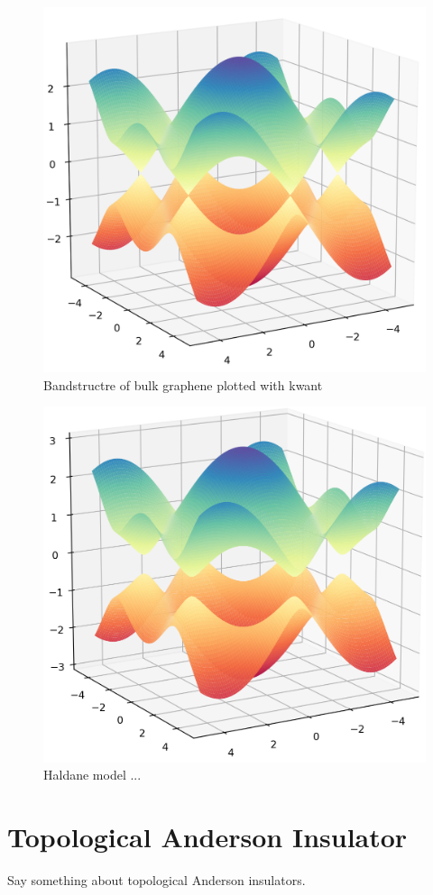 \documentclass[12pt]{article}
\numberwithin{equation}{section}
\begin{document}
\newpage
\begin{figure}[h!]
  \begin{center}
  \includegraphics[height=0.85\textheight]{./media/bulk_graphene_bands_3d_cropped.png}
  \caption{Bandstructre of  bulk graphene plotted with kwant}
  \label{fig:bsbulk3d}
  \end{center}
\end{figure}

\newpage
\begin{figure}[h!]
  \begin{center}
  \includegraphics[height=0.85\textheight]{./media/haldane_bandstruct_t2=0_m=0dot25-cropped.png}
  \caption{Haldane model ...}
  \label{fig:bsbulk3d}
  \end{center}
\end{figure}

\newpage
\section{Topological Anderson Insulator}
Say something about topological Anderson insulators.
\end{document}
